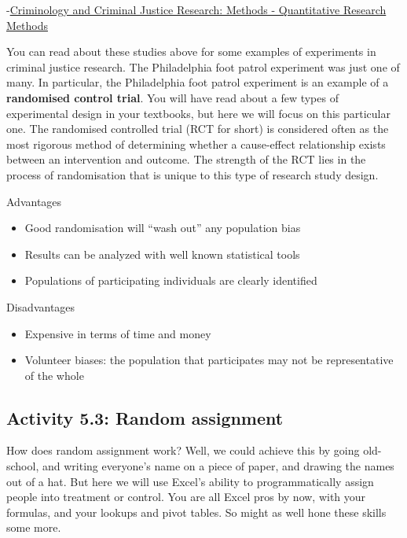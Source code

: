 \documentclass[
]{book}
\providecommand{\tightlist}{%
  \setlength{\itemsep}{0pt}\setlength{\parskip}{0pt}}
\begin{document}
-\href{http://law.jrank.org/pages/923/Criminology-Criminal-Justice-Research-Methods-Quantitative-research-methods.html}{Criminology and Criminal Justice Research: Methods - Quantitative Research Methods}

You can read about these studies above for some examples of experiments in criminal justice research. The Philadelphia foot patrol experiment was just one of many. In particular, the Philadelphia foot patrol experiment is an example of a \textbf{randomised control trial}. You will have read about a few types of experimental design in your textbooks, but here we will focus on this particular one. The randomised controlled trial (RCT for short) is considered often as the most rigorous method of determining whether a cause-effect relationship exists between an intervention and outcome. The strength of the RCT lies in the process of randomisation that is unique to this type of research study design.

Advantages

\begin{itemize}
\tightlist
\item
  Good randomisation will ``wash out'' any population bias
\item
  Results can be analyzed with well known statistical tools
\item
  Populations of participating individuals are clearly identified
\end{itemize}

Disadvantages

\begin{itemize}
\tightlist
\item
  Expensive in terms of time and money
\item
  Volunteer biases: the population that participates may not be representative of the whole
\end{itemize}

\hypertarget{activity-5.3-random-assignment}{%
\subsection{Activity 5.3: Random assignment}\label{activity-5.3-random-assignment}}

How does random assignment work? Well, we could achieve this by going old-school, and writing everyone's name on a piece of paper, and drawing the names out of a hat. But here we will use Excel's ability to programmatically assign people into treatment or control. You are all Excel pros by now, with your formulas, and your lookups and pivot tables. So might as well hone these skills some more.
\end{document}
